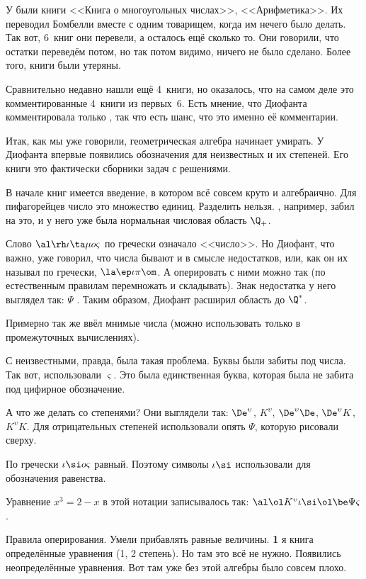 \documentclass[a4paper,oneside,fleqn,10pt]{article}
\newcommand{\isp}{\Psi}
\begin{document}
У  были книги <<Книга о многоугольных числах>>, <<Арифметика>>. Их переводил Бомбелли
вместе с одним товарищем, когда им нечего было делать. Так вот, 6~книг они перевели,
а осталось ещё сколько то. Они говорили, что остатки переведём потом, но так потом видимо, ничего не
было сделано. Более того, книги были утеряны.

Сравнительно недавно нашли ещё 4~книги, но оказалось, что на самом деле это комментированные 4~книги из первых~6.
Есть мнение, что Диофанта комментировала только , так что есть шанс, что это именно
её комментарии.

Итак, как мы уже говорили, геометрическая алгебра начинает умирать. У Диофанта впервые появились
обозначения для неизвестных и их степеней. Его книги это фактически сборники задач с решениями.

В начале книг имеется введение, в котором всё совсем круто и алгебраично.
Для пифагорейцев число это множество единиц. Разделить нельзя. ,
например, забил на это, и у него уже была нормальная числовая область $\Q_+$.

Слово $\al\rh\iota\ta\mu o\varsigma$ по гречески означало <<число>>.
Но Диофант, что важно, уже говорил, что числа бывают и в смысле недостатков, или, как
он их называл по гречески, $\la\ep\iota\pi\om$.
А оперировать с ними можно так (по естественным правилам перемножать и складывать).
Знак недостатка у него выглядел так:  $\isp$
. Таким образом, Диофант расширил область до $\Q^*$.

Примерно так же  ввёл мнимые числа (можно использовать только в промежуточных вычислениях).

С неизвестными, правда, была такая проблема. Буквы были забиты под
числа.  Так вот, использовали $\varsigma$. Это была единственная
буква, которая была не забита под цифирное обозначение.

А что же делать со степенями? Они выглядели так:
$\De^\upsilon$, $K^\upsilon$, $\De^\upsilon\De$, $\De^\upsilon K$, $K^\upsilon K$.
Для отрицательных степеней использовали опять $\isp$, которую рисовали сверху.

По гречески $\iota\si o\varsigma$ равный. Поэтому символы $\iota\si$ использовали для обозначения
равенства.

Уравнение $x^3 = 2-x$ в этой нотации записывалось так:
$\al\ol K^\upsilon \iota \si \ol\be\isp\varsigma$.

Правила оперирования. Умели прибавлять равные величины. \textbf{1} я книга определённые уравнения
(1, 2 степень). Но там это всё не нужно.
Появились неопределённые уравнения. Вот там уже без этой алгебры было совсем плохо.
\end{document}
